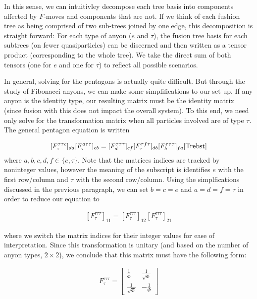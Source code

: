 In this sense, we can intuitivley decompose each tree basis into components affected by $F$-moves and components that are not. If we think of each fushion tree as being comprised of two sub-trees joined by one edge, this decomposition is straight forward: For each type of anyon ($e$ and $\tau$), the fusion tree basis for each subtrees (on fewer quasiparticles) can be discerned and then written as a tensor product (corresponding to the whole tree). We take the direct sum of both tensors (one for $e$ and one for $\tau$) to reflect all possible scenarios.

In general, solving for the pentagons is actually quite difficult. But through the study of Fibonacci anyons, we can make some simplifications to our set up. If any anyon is the identity type, our resulting matrix must be the identity matrix (since fusion with this does not impact the overall system). To this end, we need only solve for the transformation matrix when all particles involved are of type $\tau$. The general pentagon equation is written

\begin{equation}
	\begin{aligned}
		[F^{\tau\tau c}_\tau]_{da}[F^{a\tau\tau}_\tau]_{cb} = [F^{\tau\tau \tau}_d]_{cf}[F^{\tau f\tau}_\tau]_{db}[F^{\tau\tau\tau}_b]_{fa}\cite{Trebst}
	\end{aligned}
\end{equation}
where $a,b,c,d,f\in\{e,\tau\}$. Note that the matrices indices are tracked by noninteger values, however the meaning of the subscript is identifies $e$ with the first row/column and $\tau$ with the second row/column. Using the simplfications discussed in the previous paragraph, we can set $b=c=e$ and $a=d=f=\tau$ in order to reduce our equation to 

\begin{equation}
	\begin{aligned}
		[F^{\tau\tau\tau}_\tau]_{11} = [F^{\tau\tau\tau}_\tau]_{12}[F^{\tau\tau\tau}_\tau]_{21}
	\end{aligned}
\end{equation}

where we switch the matrix indices for their integer values for ease of interpretation. Since this transformation is unitary (and based on the number of anyon types, $2\times 2$), we conclude that this matrix must have the following form:

\begin{equation}
	\begin{aligned}
		F^{\tau\tau\tau}_\tau = \begin{bmatrix}
									\frac{1}{\Phi} & \frac{1}{\sqrt{\Phi}}\\
									\frac{1}{\sqrt{\Phi}} & -\frac{1}{\Phi}
								\end{bmatrix}
	\end{aligned}
\end{equation}

